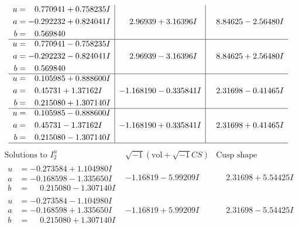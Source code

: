 \documentclass[1p]{elsarticle_modified}
\theoremstyle{definition}
\newcommand{\I}{\sqrt{-1}}
\begin{document}
$$\begin{array}{c|c|c}
\begin{aligned}
u &= \phantom{-}0.770941 + 0.758235 I \\
a &= -0.292232 + 0.824041 I \\
b &= \phantom{-}0.569840\phantom{ +0.000000I}\end{aligned}
 & \phantom{-}2.96939 + 3.16396 I & \phantom{-}8.84625 - 2.56480 I \\ \hline\begin{aligned}
u &= \phantom{-}0.770941 - 0.758235 I \\
a &= -0.292232 - 0.824041 I \\
b &= \phantom{-}0.569840\phantom{ +0.000000I}\end{aligned}
 & \phantom{-}2.96939 - 3.16396 I & \phantom{-}8.84625 + 2.56480 I \\ \hline\begin{aligned}
u &= \phantom{-}0.105985 + 0.888600 I \\
a &= \phantom{-}0.45731 + 1.37162 I \\
b &= \phantom{-}0.215080 + 1.307140 I\end{aligned}
 & -1.168190 - 0.335841 I & \phantom{-}2.31698 - 0.41465 I \\ \hline\begin{aligned}
u &= \phantom{-}0.105985 - 0.888600 I \\
a &= \phantom{-}0.45731 - 1.37162 I \\
b &= \phantom{-}0.215080 - 1.307140 I\end{aligned}
 & -1.168190 + 0.335841 I & \phantom{-}2.31698 + 0.41465 I\\
 \hline 
 \end{array}$$\newpage$$\begin{array}{c|c|c}  
\text{Solutions to }I^u_{2}& \I (\text{vol} + \sqrt{-1}CS) & \text{Cusp shape}\\
 \hline 
\begin{aligned}
u &= -0.273584 + 1.104980 I \\
a &= -0.168598 - 1.335650 I \\
b &= \phantom{-}0.215080 - 1.307140 I\end{aligned}
 & -1.16819 - 5.99209 I & \phantom{-}2.31698 + 5.54425 I \\ \hline\begin{aligned}
u &= -0.273584 - 1.104980 I \\
a &= -0.168598 + 1.335650 I \\
b &= \phantom{-}0.215080 + 1.307140 I\end{aligned}
 & -1.16819 + 5.99209 I & \phantom{-}2.31698 - 5.54425 I \\ \hline\begin{aligned}

\end{aligned}
\end{array}$$
\end{document}
